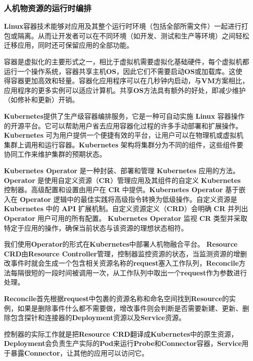 \documentclass[a4paper, 12pt]{article}
\theoremstyle{definition}
\begin{document}
\subsubsection{人机物资源的运行时编排}

\textbf{Linux}容器技术能够对应用及其整个运行时环境（包括全部所需文件）一起进行打包或隔离。从而让开发者可以在不同环境（如开发、测试和生产等环境）之间轻松迁移应用，同时还可保留应用的全部功能。

容器是虚拟化的主要形式之一，相比于虚拟机需要虚拟化基础硬件，每个虚拟机都运行一个操作系统，容器共享主机\textbf{OS}，因此它们不需要启动\textbf{OS}或加载库。这使得容器更加高效和轻量。容器化应用程序可以在几秒钟内启动，与\textbf{VM}方案相比，应用程序的更多实例可以适应计算机。共享\textbf{OS}方法具有额外的好处，即减少维护（如修补和更新）开销。

\textbf{Kubernetes}提供了生产级容器编排服务，它是一种可自动实施 \textbf{Linux} 容器操作的开源平台。它可以帮助用户省去应用容器化过程的许多手动部署和扩展操作。\textbf{Kubernetes} 可为用户提供一个便捷有效的平台，让用户可以在物理机或虚拟机集群上调用和运行容器。\textbf{Kubernetes} 架构将集群分为不同的组件，这些组件要协同工作来维护集群的预期状态。

\textbf{Kubernetes Operator} 是一种封装、部署和管理 \textbf{Kubernetes} 应用的方法。\textbf{Operator} 是使用自定义资源（\textbf{CR}）管理应用及其组件的自定义 \textbf{Kubernetes} 控制器。高级配置和设置由用户在 \textbf{CR} 中提供。\textbf{Kubernetes Operator} 基于嵌入在 \textbf{Operator} 逻辑中的最佳实践将高级指令转换为低级操作。自定义资源是 \textbf{Kubernetes} 中的 \textbf{API} 扩展机制。自定义资源定义（\textbf{CRD}）会明确 \textbf{CR} 并列出 \textbf{Operator} 用户可用的所有配置。 \textbf{Kubernetes Operator} 监视 \textbf{CR} 类型并采取特定于应用的操作，确保当前状态与该资源的理想状态相符。

我们使用\textbf{Operator}的形式在\textbf{Kubernetes}中部署人机物融合平台。
\textbf{Resource CRD}由\textbf{Resource Controller}管理，控制器监控资源的状态，当监测资源的增删改事件时就会生成一个包含相关资源名称的\textbf{request}塞入工作队列，\textbf{Reconcile}方法每隔很短的一段时间被调用一次，从工作队列中取出一个\textbf{request}作为参数进行处理。

\textbf{Reconcile}首先根据\textbf{request}中包裹的资源名称和命名空间找到\textbf{Resource}的实例，如果是删除事件什么都不需要做，增改事件则会判断是否需要新建、更新、删除包含探针和连接器的\textbf{Deployment}资源以及\textbf{Service}资源。

控制器的实际工作就是把\textbf{Resource CRD}翻译成\textbf{Kubernetes}中的原生资源，\textbf{Deployment}会负责生产实际的\textbf{Pod}来运行\textbf{Probe}和\textbf{Connector}容器，\textbf{Service}用于暴露\textbf{Connector}，让其他的应用可以访问它。
\end{document}
